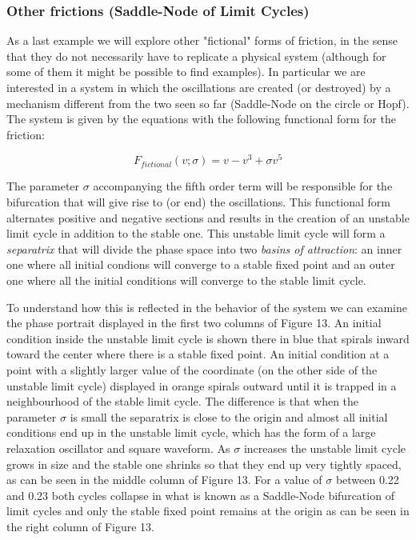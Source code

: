\documentclass{article}
\begin{document}
\subsubsection{Other frictions (Saddle-Node of Limit Cycles)}

As a last example we will explore other "fictional" forms of friction, in the sense that they do not necessarily have to replicate a physical system (although for some of them it might be possible to find examples). 
In particular we are interested in a system in which the oscillations are created (or destroyed) by a mechanism different from the two seen so far (Saddle-Node on the circle or Hopf). 
The system is given by the equations with the following functional form for the friction:

\begin{equation} \label{eq_fictional}
    F_{fictional}(v;\sigma) = v - v^3 + \sigma v^5  
\end{equation}

The parameter $\sigma$ accompanying the fifth order term will be responsible for the bifurcation that will give rise to (or end) the oscillations.
This functional form alternates positive and negative sections and results in the creation of an unstable limit cycle in addition to the stable one. 
This unstable limit cycle will form a {\em separatrix} that will divide the phase space into two {\em basins of attraction}: an inner one where all initial condions will converge to a stable fixed point and an outer one where all the initial conditions will converge to the stable limit cycle. 

To understand how this is reflected in the behavior of the system we can examine the phase portrait displayed in the first two columns of Figure 13. 
An initial condition inside the unstable limit cycle is shown there in blue that spirals inward toward the center where there is a stable fixed point. 
An initial condition at a point with a slightly larger value of the coordinate (on the other side of the unstable limit cycle) displayed in orange spirals outward until it is trapped in a neighbourhood of the stable limit cycle. 
The difference is that when the parameter $\sigma$ is small the separatrix is close to the origin and almost all initial conditions end up in the unstable limit cycle, which has the form of a large relaxation oscillator and square waveform. 
As $\sigma$ increases the unstable limit cycle grows in size and the stable one shrinks so that they end up very tightly spaced, as can be seen in the middle column of Figure 13. 
For a value of $\sigma$ between 0.22 and 0.23 both cycles collapse in what is known as a Saddle-Node bifurcation of limit cycles and only the stable fixed point remains at the origin as can be seen in the right column of Figure 13. 
\end{document}
